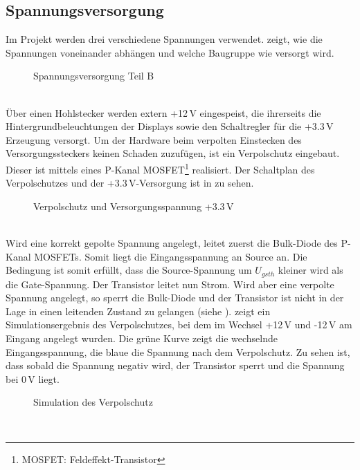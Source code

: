 \subsection{Spannungsversorgung}
Im Projekt werden drei verschiedene Spannungen verwendet.  zeigt, wie die Spannungen voneinander abhängen und welche Baugruppe wie versorgt wird. 
\begin{figure}[htp]
	\center
    \caption{Spannungsversorgung Teil B}
    \label{fig:teilb_supply}
\end{figure}\\
Über einen Hohlstecker werden extern +12\,V eingespeist, die ihrerseits die Hintergrundbeleuchtungen der Displays sowie den Schaltregler für die +3.3\,V Erzeugung versorgt. Um der Hardware beim verpolten Einstecken des Versorgungssteckers keinen Schaden zuzufügen, ist ein Verpolschutz eingebaut. Dieser ist mittels eines P-Kanal MOSFET\footnote{MOSFET: Feldeffekt-Transistor}  realisiert. Der Schaltplan des Verpolschutzes und der +3.3\,V-Versorgung ist in  zu sehen.
\begin{figure}[htp]
	\center
    \caption{Verpolschutz und Versorgungsspannung +3.3\,V}
    \label{fig:3_3_supply}
\end{figure}\\
Wird eine korrekt gepolte Spannung angelegt, leitet zuerst die Bulk-Diode des P-Kanal MOSFETs. Somit liegt die Eingangsspannung an Source an. Die Bedingung ist somit erfüllt, dass die Source-Spannung um $U_{gsth}$ kleiner wird als die Gate-Spannung. Der Transistor leitet nun Strom. Wird aber eine verpolte Spannung angelegt, so sperrt die Bulk-Diode und der Transistor ist nicht in der Lage in einen leitenden Zustand zu gelangen (siehe \cite{Miller2010}).  zeigt ein Simulationsergebnis des Verpolschutzes, bei dem im Wechsel +12\,V und -12\,V am Eingang angelegt wurden. Die grüne Kurve zeigt die wechselnde Eingangsspannung, die blaue die Spannung nach dem Verpolschutz. Zu sehen ist, dass sobald die Spannung negativ wird, der Transistor sperrt und die Spannung bei 0\,V liegt.
\begin{figure}[htp]
	\center
    \caption{Simulation des Verpolschutz}
    \label{fig:verpolschutz_sim}
\end{figure}\\


